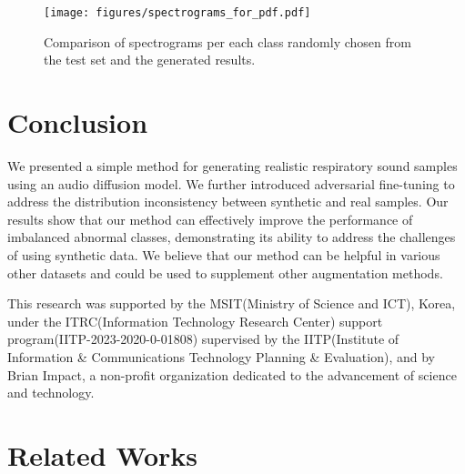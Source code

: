 \documentclass{article}
\begin{document}
\begin{figure}[!ht]
    \centering
    \texttt{[image: figures/spectrograms\_for\_pdf.pdf]} 
    \caption{Comparison of spectrograms per each class randomly chosen from the test set and the generated results.}
    \label{fig:fig2}
\end{figure}


\section{Conclusion}
We presented a simple method for generating realistic respiratory sound samples using an audio diffusion model. 
We further introduced adversarial fine-tuning to address the distribution inconsistency between synthetic and real samples. 
Our results show that our method can effectively improve the performance of imbalanced abnormal classes, demonstrating its ability to address the challenges of using synthetic data.
We believe that our method can be helpful in various other datasets and could be used to supplement other augmentation methods.









\begin{ack}
This research was supported by the MSIT(Ministry of Science and ICT), Korea, under the ITRC(Information Technology Research Center) support program(IITP-2023-2020-0-01808) supervised by the IITP(Institute of Information \& Communications Technology Planning \& Evaluation), and by Brian Impact, a non-profit organization dedicated to the advancement of science and technology.

\end{ack}






\vfill\pagebreak
\appendix


\section{Related Works}
\label{appendix_related}
\end{document}
